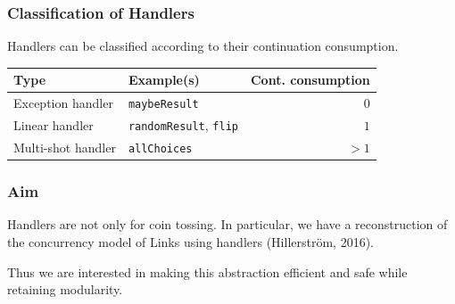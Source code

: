 \documentclass[10pt,compress]{beamer}
\begin{document}


\begin{frame}
  \frametitle{Classification of Handlers}
Handlers can be classified according to their continuation consumption.
  \begin{table}
    \begin{tabular}{| l | l | r |}
      \hline
      Type & Example(s) & Cont. consumption \\
      \hline
      Exception handler & \lstinline$maybeResult$ & $0$ \\
      \hline
      Linear handler    & \lstinline$randomResult$, \lstinline$flip$ & $1$ \\
      \hline
      Multi-shot handler & \lstinline$allChoices$ & $> 1$ \\
      \hline
    \end{tabular}
  \end{table}
\end{frame}

\begin{frame}
  \frametitle{Aim}

  Handlers are not only for coin tossing. In
  particular, we have a reconstruction of the concurrency model of
  Links using handlers (Hillerström, 2016).
  
  \vspace{1cm}
  
  Thus we are interested in making this abstraction efficient and safe
  while retaining modularity.
\end{frame}
\end{document}
